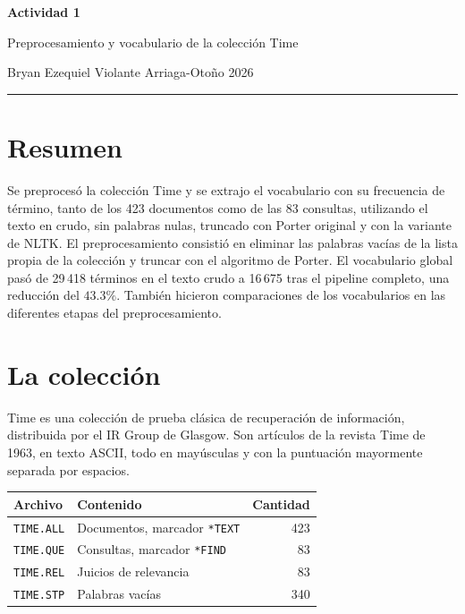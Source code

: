 \documentclass[11pt,letterpaper]{article}
\newcommand{\periodo}{Otoño 2026}
\newcommand{\alumno}{Bryan Ezequiel Violante Arriaga}
\begin{document}

\begin{center}
  {\LARGE\bfseries Actividad 1\par}
  \vspace{0.3em}
  {\large Preprocesamiento y vocabulario de la colección Time\par}
  \vspace{0.5em}
  {\small \alumno \quad-\quad \periodo\par}
  \vspace{0.4em}
  \rule{\linewidth}{0.5pt}
\end{center}

\section*{Resumen}

Se preprocesó la colección Time y se extrajo el vocabulario con su
frecuencia de término, tanto de los 423 documentos como de las 83
consultas, utilizando el texto en crudo, sin palabras nulas,
truncado con Porter original y con la variante de NLTK. 
El preprocesamiento consistió en eliminar las palabras
vacías de la lista propia de la colección y truncar con el algoritmo
de Porter. El vocabulario global pasó de 29\,418 términos en el
texto crudo a 16\,675 tras el pipeline completo, una reducción del
$43.3\%$. También hicieron comparaciones de los vocabularios en las 
diferentes etapas del preprocesamiento.

\section{La colección}

Time es una colección de prueba clásica de recuperación de
información, distribuida por el IR Group de Glasgow. Son artículos de
la revista Time de 1963, en texto ASCII, todo en mayúsculas y con la
puntuación mayormente separada por espacios.

\begin{center}
\begin{tabular}{llr}
    \toprule
    \textbf{Archivo} & \textbf{Contenido} & \textbf{Cantidad} \\
    \midrule
    \texttt{TIME.ALL} & Documentos, marcador \texttt{*TEXT} & 423 \\
    \texttt{TIME.QUE} & Consultas, marcador \texttt{*FIND}  & 83 \\
    \texttt{TIME.REL} & Juicios de relevancia               & 83 \\
    \texttt{TIME.STP} & Palabras vacías                     & 340 \\
    \bottomrule
\end{tabular}
\end{center}
\end{document}
